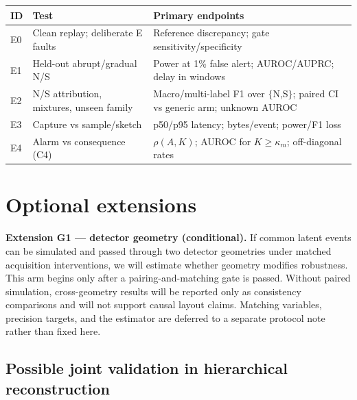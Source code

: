 \documentclass[10pt,twocolumn]{extarticle}
\begin{document}
\begin{center}
\scriptsize
{}
\begin{tabularx}{\columnwidth}{@{}p{0.16in}p{0.95in}Y@{}}
\toprule
ID & Test & Primary endpoints \\
\midrule
E0 & Clean replay; deliberate E faults & Reference discrepancy; gate
sensitivity/specificity \\
E1 & Held-out abrupt/gradual N/S & Power at 1\% false alert; AUROC/AUPRC;
delay in windows \\
E2 & N/S attribution, mixtures, unseen family & Macro/multi-label F1 over
$\{$N,S$\}$; paired CI vs generic arm; unknown AUROC \\
E3 & Capture vs sample/sketch & p50/p95 latency; bytes/event; power/F1 loss \\
E4 & Alarm vs consequence (C4) & $\rho(A,K)$; AUROC for $K\geq\kappa_m$;
off-diagonal rates \\
\bottomrule
\end{tabularx}
\label{tab:experiments}
\vspace{-0.5em}
\end{center}

\section{Optional extensions}

\begin{tcolorbox}[colback=black!3,colframe=black!35,boxrule=0.4pt,
  left=4pt,right=4pt,top=3pt,bottom=3pt,arc=1pt]
\footnotesize
\textbf{Extension G1 --- detector geometry (conditional).} If common latent
events can be simulated and passed through two detector geometries under
matched acquisition interventions, we will estimate whether geometry modifies
robustness. This arm begins only after a pairing-and-matching gate is passed.
Without paired simulation, cross-geometry results will be reported only as
consistency comparisons and will not support causal layout claims. Matching
variables, precision targets, and the estimator are deferred to a separate
protocol note rather than fixed here.
\end{tcolorbox}

\subsection*{Possible joint validation in hierarchical reconstruction}
\end{document}
